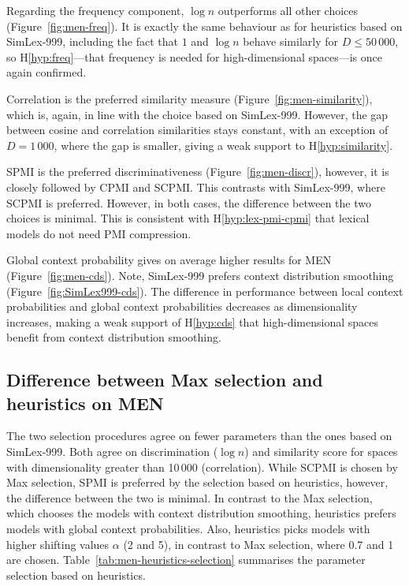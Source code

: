 Regarding the frequency component, $\log n$ outperforms all other choices (Figure~\ref{fig:men-freq}). It is exactly the same behaviour as for heuristics based on SimLex-999, including the fact that $1$ and $\log n$ behave similarly for $D \leq 50\,000$, so H\ref{hyp:freq}---that frequency is needed for high-dimensional spaces---is once again confirmed.


Correlation is the preferred similarity measure (Figure~\ref{fig:men-similarity}), which is, again, in line with the choice based on SimLex-999. However, the gap between cosine and correlation similarities stays constant, with an exception of $D = 1\,000$, where the gap is smaller, giving a weak support to H\ref{hyp:similarity}.

SPMI is the preferred discriminativeness (Figure~\ref{fig:men-discr}), however, it is closely followed by CPMI and SCPMI. This contrasts with SimLex-999, where SCPMI is preferred. However, in both cases, the difference between the two choices is minimal. This is consistent with H\ref{hyp:lex-pmi-cpmi} that lexical models do not need PMI compression.


Global context probability gives on average higher results for MEN (Figure~\ref{fig:men-cds}). Note, SimLex-999 prefers context distribution smoothing (Figure~\ref{fig:SimLex999-cds}). The difference in performance between local context probabilities and global context probabilities decreases as dimensionality increases, making a weak support of H\ref{hyp:cds} that high-dimensional spaces benefit from context distribution smoothing.

\subsection{Difference between Max selection and heuristics on MEN}

The two selection procedures agree on fewer parameters than the ones based on SimLex-999. Both agree on discrimination ($\log n$) and similarity score for spaces with dimensionality greater than 10\,000 (correlation). While SCPMI is chosen by Max selection, SPMI is preferred by the selection based on heuristics, however, the difference between the two is minimal. In contrast to the Max selection, which chooses the models with context distribution smoothing, heuristics prefers models with global context probabilities. Also, heuristics picks models with higher shifting values $\alpha$ (2 and 5), in contrast to Max selection, where 0.7 and 1 are chosen. Table~\ref{tab:men-heuristics-selection} summarises the parameter selection based on heuristics.


